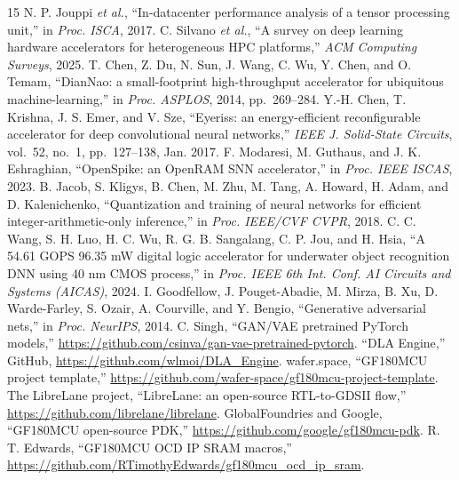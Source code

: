 \documentclass[conference,a4paper]{APSIPA2026}
\begin{document}
\begin{thebibliography}{15}
 N. P. Jouppi \emph{et al.}, ``In-datacenter performance analysis of a tensor processing unit,'' in \emph{Proc. ISCA}, 2017.
 C. Silvano \emph{et al.}, ``A survey on deep learning hardware accelerators for heterogeneous HPC platforms,'' \emph{ACM Computing Surveys}, 2025.
 T. Chen, Z. Du, N. Sun, J. Wang, C. Wu, Y. Chen, and O. Temam, ``DianNao: a small-footprint high-throughput accelerator for ubiquitous machine-learning,'' in \emph{Proc. ASPLOS}, 2014, pp.~269--284.
 Y.-H. Chen, T. Krishna, J. S. Emer, and V. Sze, ``Eyeriss: an energy-efficient reconfigurable accelerator for deep convolutional neural networks,'' \emph{IEEE J. Solid-State Circuits}, vol.~52, no.~1, pp.~127--138, Jan. 2017.
 F. Modaresi, M. Guthaus, and J. K. Eshraghian, ``OpenSpike: an OpenRAM SNN accelerator,'' in \emph{Proc. IEEE ISCAS}, 2023.
 B. Jacob, S. Kligys, B. Chen, M. Zhu, M. Tang, A. Howard, H. Adam, and D. Kalenichenko, ``Quantization and training of neural networks for efficient integer-arithmetic-only inference,'' in \emph{Proc. IEEE/CVF CVPR}, 2018.
 C. C. Wang, S. H. Luo, H. C. Wu, R. G. B. Sangalang, C. P. Jou, and H. Hsia, ``A 54.61 GOPS 96.35 mW digital logic accelerator for underwater object recognition DNN using 40 nm CMOS process,'' in \emph{Proc. IEEE 6th Int. Conf. AI Circuits and Systems (AICAS)}, 2024.
 I. Goodfellow, J. Pouget-Abadie, M. Mirza, B. Xu, D. Warde-Farley, S. Ozair, A. Courville, and Y. Bengio, ``Generative adversarial nets,'' in \emph{Proc. NeurIPS}, 2014.
 C. Singh, ``GAN/VAE pretrained PyTorch models,'' \url{https://github.com/csinva/gan-vae-pretrained-pytorch}.
 ``DLA Engine,'' GitHub, \url{https://github.com/wlmoi/DLA_Engine}.
 wafer.space, ``GF180MCU project template,'' \url{https://github.com/wafer-space/gf180mcu-project-template}.
 The LibreLane project, ``LibreLane: an open-source RTL-to-GDSII flow,'' \url{https://github.com/librelane/librelane}.
 GlobalFoundries and Google, ``GF180MCU open-source PDK,'' \url{https://github.com/google/gf180mcu-pdk}.
 R. T. Edwards, ``GF180MCU OCD IP SRAM macros,'' \url{https://github.com/RTimothyEdwards/gf180mcu_ocd_ip_sram}.
\end{thebibliography}
\end{document}
